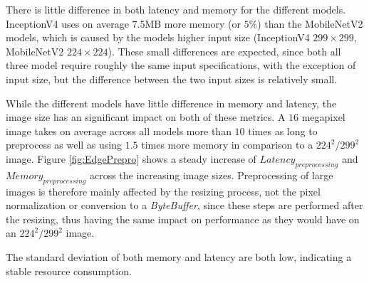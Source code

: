 There is little difference in both latency and memory for the different models. 
InceptionV4 uses on average $7.5$MB more memory (or $5\%$) than the MobileNetV2 models, which is caused by the models higher input size (InceptionV4 $299\times299$, MobileNetV2 $224\times224$). 
These small differences are expected, since both all three model require roughly the same input specifications, with the exception of input size, but the difference between the two input sizes is relatively small.

While the different models have little difference in memory and latency, the image size has an significant impact on both of these metrics.
A $16$ megapixel image takes on average across all models more than $10$ times as long to preprocess as well as using $1.5$ times more memory in comparison to a $224^2/299^2$ image.
Figure \ref{fig:EdgePrepro} shows a steady increase of $Latency_{preprocessing}$ and $Memory_{preprocessing}$ across the increasing image sizes.
Preprocessing of large images is therefore mainly affected by the resizing process, not the pixel normalization or conversion to a \emph{ByteBuffer}, since these steps are performed after the resizing, thus having the same impact on performance as they would have on an $224^2/299^2$ image.

The standard deviation of both memory and latency are both low, indicating a stable resource consumption.



